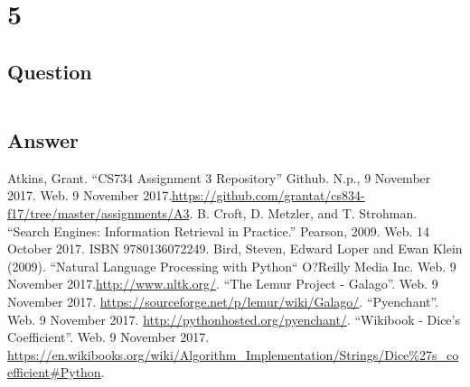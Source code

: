 \documentclass[letterpaper,11pt]{article}
\begin{document}
\clearpage


\section*{5}

\subsection*{Question}

\begin{verbatim}

\end{verbatim}

\subsection*{Answer}


\clearpage


\clearpage



\begin{thebibliography}{9}
Atkins, Grant. ``CS734 Assignment 3 Repository'' Github. N.p., 9 November 2017. Web. 9 November 2017.\url{https://github.com/grantat/cs834-f17/tree/master/assignments/A3}.
B. Croft, D. Metzler, and T. Strohman. ``Search Engines: Information Retrieval in Practice.'' Pearson, 2009. Web. 14 October 2017. ISBN 9780136072249.
Bird, Steven, Edward Loper and Ewan Klein (2009). ``Natural Language Processing with Python`` O?Reilly Media Inc. Web. 9 November 2017.\url{http://www.nltk.org/}.
``The Lemur Project - Galago''. Web. 9 November 2017. \url{https://sourceforge.net/p/lemur/wiki/Galago/}.
``Pyenchant''. Web. 9 November 2017. \url{http://pythonhosted.org/pyenchant/}.
``Wikibook - Dice's Coefficient''. Web. 9 November 2017. \url{https://en.wikibooks.org/wiki/Algorithm_Implementation/Strings/Dice%27s_coefficient#Python}.
\end{thebibliography}
\end{document}
